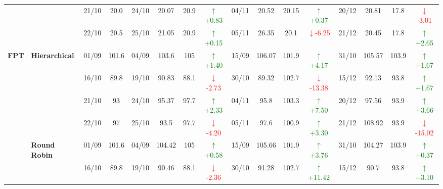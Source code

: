 {\begin{longtable}{llcc|cccc|cccc|cccc}
&
& 21/10 & 20.0 & 24/10 & 20.07 & 20.9 & \textcolor{green}{\(\uparrow\)+0.83} & 04/11 & 20.52 & 20.15 & \textcolor{green}{\(\uparrow\)+0.37} & 20/12 & 20.81 & 17.8 & \textcolor{red}{\(\downarrow\)-3.01} \\

&
& 22/10 & 20.5 & 25/10 & 21.05 & 20.9 & \textcolor{green}{\(\uparrow\)+0.15} & 05/11 & 26.35 & 20.1 & \textcolor{red}{\(\downarrow\)-6.25} & 21/12 & 20.45 & 17.8 & \textcolor{green}{\(\uparrow\)+2.65} \\
\midrule



\multirow{12}{*}{\textbf{FPT}} 
& \textbf{Hierarchical}
& 01/09 & 101.6 & 04/09 & 103.6 & 105 & \textcolor{green}{\(\uparrow\)+1.40} & 15/09 & 106.07 & 101.9 & \textcolor{green}{\(\uparrow\)+4.17} & 31/10 & 105.57 & 103.9 & \textcolor{green}{\(\uparrow\)+1.67} \\

&
& 16/10 & 89.8 & 19/10 & 90.83 & 88.1 & \textcolor{red}{\(\downarrow\)-2.73} & 30/10 & 89.32 & 102.7 & \textcolor{red}{\(\downarrow\)-13.38} & 15/12 & 92.13 & 93.8 & \textcolor{green}{\(\uparrow\)+1.67} \\

&
& 21/10 & 93 & 24/10 & 95.37 & 97.7 & \textcolor{green}{\(\uparrow\)+2.33} & 04/11 & 95.8 & 103.3 & \textcolor{green}{\(\uparrow\)+7.50} & 20/12 & 97.56 & 93.9 & \textcolor{green}{\(\uparrow\)+3.66} \\

&
& 22/10 & 97 & 25/10 & 93.5 & 97.7 & \textcolor{red}{\(\downarrow\)-4.20} & 05/11 & 97.6 & 100.9 & \textcolor{green}{\(\uparrow\)+3.30} & 21/12 & 108.92 & 93.9 & \textcolor{red}{\(\downarrow\)-15.02} \\
\cmidrule(lr){2-16}


& \textbf{Round Robin}
& 01/09 & 101.6 & 04/09 & 104.42 & 105 & \textcolor{green}{\(\uparrow\)+0.58} & 15/09 & 105.66 & 101.9 & \textcolor{green}{\(\uparrow\)+3.76} & 31/10 & 104.27 & 103.9 & \textcolor{green}{\(\uparrow\)+0.37} \\

&
& 16/10 & 89.8 & 19/10 & 90.46 & 88.1 & \textcolor{red}{\(\downarrow\)-2.36} & 30/10 & 91.28 & 102.7 & \textcolor{green}{\(\uparrow\)+11.42} & 15/12 & 90.7 & 93.8 & \textcolor{green}{\(\uparrow\)+3.10} \\


\end{longtable}}
